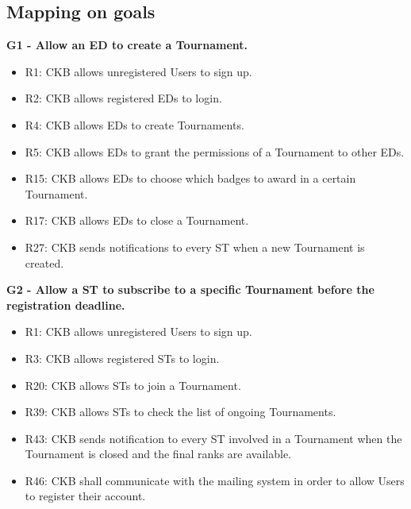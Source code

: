 \subsection{Mapping on goals}
\label{subsec:mapping_on_goals}%
\textbf{G1 - Allow an ED to create a Tournament.}
\begin{itemize}
    \item R1: CKB allows unregistered Users to sign up.
    \item R2: CKB allows registered EDs to login.
    \item R4: CKB allows EDs to create Tournaments.
    \item R5: CKB allows EDs to grant the permissions of a Tournament to other EDs.
    \item R15: CKB allows EDs to choose which badges to award in a certain Tournament.
    \item R17: CKB allows EDs to close a Tournament.
    \item R27: CKB sends notifications to every ST when a new Tournament is created.
\end{itemize}

\vspace{1.5cm}
\textbf{G2 - Allow a ST to subscribe to a specific Tournament before the registration deadline.}
\begin{itemize}
    \item R1: CKB allows unregistered Users to sign up.
    \item R3: CKB allows registered STs to login.
    \item R20: CKB allows STs to join a Tournament.
    \item R39: CKB allows STs to check the list of ongoing Tournaments.
    \item R43: CKB sends notification to every ST involved in a Tournament when the Tournament is closed and the final ranks are available.
    \item R46: CKB shall communicate with the mailing system in order to allow Users to register their account.
\end{itemize}



